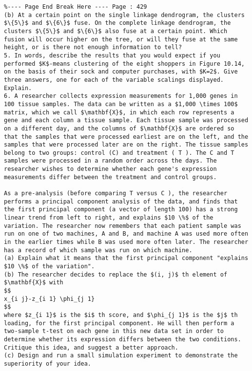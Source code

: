 \documentclass[10pt]{article}
\begin{document}
\begin{verbatim}
%---- Page End Break Here ---- Page : 429
(b) At a certain point on the single linkage dendrogram, the clusters $\{5\}$ and $\{6\}$ fuse. On the complete linkage dendrogram, the clusters $\{5\}$ and $\{6\}$ also fuse at a certain point. Which fusion will occur higher on the tree, or will they fuse at the same height, or is there not enough information to tell?
5. In words, describe the results that you would expect if you performed $K$-means clustering of the eight shoppers in Figure 10.14, on the basis of their sock and computer purchases, with $K=2$. Give three answers, one for each of the variable scalings displayed. Explain.
6. A researcher collects expression measurements for 1,000 genes in 100 tissue samples. The data can be written as a $1,000 \times 100$ matrix, which we call $\mathbf{X}$, in which each row represents a gene and each column a tissue sample. Each tissue sample was processed on a different day, and the columns of $\mathbf{X}$ are ordered so that the samples that were processed earliest are on the left, and the samples that were processed later are on the right. The tissue samples belong to two groups: control (C) and treatment ( T ). The C and T samples were processed in a random order across the days. The researcher wishes to determine whether each gene's expression measurements differ between the treatment and control groups.

As a pre-analysis (before comparing T versus C ), the researcher performs a principal component analysis of the data, and finds that the first principal component (a vector of length 100) has a strong linear trend from left to right, and explains $10 \%$ of the variation. The researcher now remembers that each patient sample was run on one of two machines, A and B, and machine A was used more often in the earlier times while B was used more often later. The researcher has a record of which sample was run on which machine.
(a) Explain what it means that the first principal component "explains $10 \%$ of the variation".
(b) The researcher decides to replace the $(i, j)$ th element of $\mathbf{X}$ with
$$
x_{i j}-z_{i 1} \phi_{j 1}
$$
where $z_{i 1}$ is the $i$ th score, and $\phi_{j 1}$ is the $j$ th loading, for the first principal component. He will then perform a two-sample t-test on each gene in this new data set in order to determine whether its expression differs between the two conditions. Critique this idea, and suggest a better approach.
(c) Design and run a small simulation experiment to demonstrate the superiority of your idea.


\end{verbatim}
\end{document}
